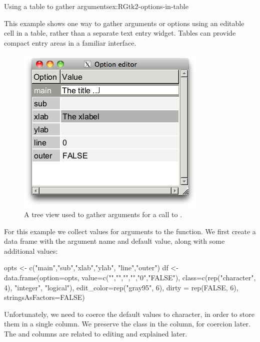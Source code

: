 \begin{example}{Using a table to gather arguments}{ex:RGtk2-options-in-table}

This example shows one way to gather arguments or options using an
editable cell in a table, rather than a separate text entry
widget. Tables can provide compact entry areas in a familiar
interface.

\begin{figure}
  \centering
  \includegraphics[width=.5\textwidth]{fig-RGtk2-option-editor.png}
  \caption{A tree view used to gather arguments for a call to .}
  \label{fig:RGtk2-option-editor}
\end{figure}

For this example we collect values for arguments to the
 function. We first create a data frame with the
argument name and default value, along with some additional values:
\begin{Schunk}
\begin{Sinput}
 opts <- c("main","sub","xlab","ylab", "line","outer")
 df <- data.frame(option=opts,
            value=c("","","","","0","FALSE"),
            class=c(rep("character", 4), "integer", "logical"),
            edit_color=rep("gray95", 6),
            dirty = rep(FALSE, 6),
            stringsAsFactors=FALSE)
\end{Sinput}
\end{Schunk}
%
Unfortunately, we need to coerce the default values to character, in
order to store them in a single column. We preserve the class in the
 column, for coercion later. The  and
 columns are related to editing and explained later.
%


\end{example}
